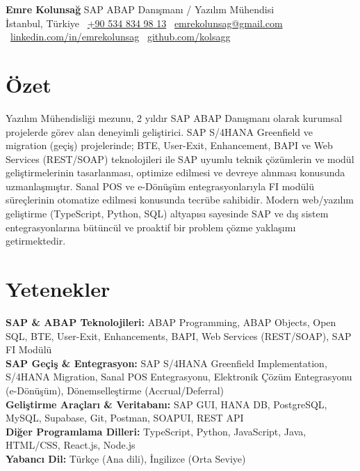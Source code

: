 \documentclass[10pt,a4paper]{extarticle}
\begin{document}
\begin{center}
    \begin{minipage}{\textwidth}
        \centering
        {\LARGE\textbf{Emre Kolunsağ}} \hspace{2pt} {\LARGE{SAP ABAP Danışmanı / Yazılım Mühendisi}}\\[10pt]
        İstanbul, Türkiye \textbullet\
        \href{tel:+905348349813}{+90 534 834 98 13} \textbullet\
        \href{mailto:emrekolunsag@gmail.com}{emrekolunsag@gmail.com} \textbullet\
        \href{https://linkedin.com/in/emrekolunsag}{linkedin.com/in/emrekolunsag} \textbullet\
        \href{https://github.com/kolsagg}{github.com/kolsagg}
    \end{minipage}
\end{center}
\section{Özet}
Yazılım Mühendisliği mezunu, 2 yıldır SAP ABAP Danışmanı olarak kurumsal projelerde görev alan
deneyimli geliştirici. SAP S/4HANA Greenfield ve migration (geçiş) projelerinde; BTE, User-Exit, Enhancement,
BAPI ve Web Services (REST/SOAP) teknolojileri ile SAP uyumlu teknik çözümlerin ve modül geliştirmelerinin
tasarlanması, optimize edilmesi ve devreye alınması konusunda uzmanlaşmıştır. Sanal POS ve e-Dönüşüm
entegrasyonlarıyla FI modülü süreçlerinin otomatize edilmesi konusunda tecrübe sahibidir. Modern web/yazılım
geliştirme (TypeScript, Python, SQL) altyapısı sayesinde SAP ve dış sistem entegrasyonlarına bütüncül ve
proaktif bir problem çözme yaklaşımı getirmektedir.
\section{Yetenekler}
\textbf{SAP \& ABAP Teknolojileri:} ABAP Programming, ABAP Objects, Open SQL, BTE, User-Exit, Enhancements, BAPI, Web Services (REST/SOAP), SAP FI Modülü\\
\textbf{SAP Geçiş \& Entegrasyon:} SAP S/4HANA Greenfield Implementation, S/4HANA Migration, Sanal POS Entegrasyonu, Elektronik Çözüm Entegrasyonu (e-Dönüşüm), Dönemselleştirme (Accrual/Deferral)\\
\textbf{Geliştirme Araçları \& Veritabanı:} SAP GUI, HANA DB, PostgreSQL, MySQL, Supabase, Git, Postman, SOAPUI, REST API\\
\textbf{Diğer Programlama Dilleri:} TypeScript, Python, JavaScript, Java, HTML/CSS, React.js, Node.js\\
\textbf{Yabancı Dil:} Türkçe (Ana dili), İngilizce (Orta Seviye)
\end{document}

